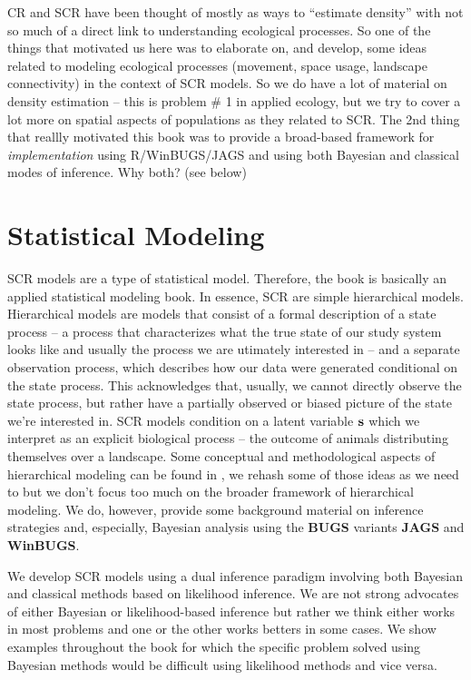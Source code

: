 CR and SCR have been thought of mostly as ways to ``estimate density''
with not so much of a direct link to understanding ecological
processes. So one of the things that motivated us here was to
elaborate on, and develop, some ideas related to modeling ecological
processes (movement, space usage, landscape connectivity) in the
context of SCR models.  So we do have a lot of material on density
estimation -- this is problem \# 1 in applied ecology, but we try to
cover a lot more on spatial aspects of populations as they related to
SCR.  The 2nd thing that reallly motivated this book was to provide a
broad-based framework for {\it implementation} using R/WinBUGS/JAGS
and using both Bayesian and classical modes of inference.  Why both?
(see below)

\section*{Statistical Modeling}

SCR models are a type of statistical model. Therefore, the book is
basically an applied statistical modeling book.  In essence, SCR are
simple hierarchical models.  Hierarchical models are models that
consist of a formal description of a state process -- a process that
characterizes what the true state of our study system looks like and
usually the process we are utimately interested in -- and a separate
observation process, which describes how our data were generated
conditional on the state process. This acknowledges that, usually, we
cannot directly observe the state process, but rather have a partially
observed or biased picture of the state we're interested in.  SCR
models condition on a latent variable ${\bf s}$ which we interpret as
an explicit biological process -- the outcome of animals distributing
themselves over a landscape.  Some conceptual and methodological
aspects of hierarchical modeling can be found in
\citet{royle_dorazio:2008}, we rehash some of those ideas as we need
to but we don't focus too much on the broader framework of
hierarchical modeling.  We do, however, provide some background
material on inference strategies and, especially, Bayesian analysis
using the {\bf BUGS} variants {\bf JAGS} and {\bf WinBUGS}.

We develop SCR models using a dual inference paradigm involving both
Bayesian and classical methods based on likelihood inference.
We are not strong advocates of either Bayesian or likelihood-based
inference but rather we think either works in most problems and one or
the other works betters in some cases. 
We show examples throughout the
book for which the specific problem solved using Bayesian methods
would be difficult using likelihood methods and vice versa.
























